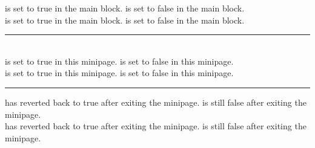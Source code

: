 \ifTestIfa
     is set to true in the main block.
\else
     is set to false in the main block.
\fi\\
\ifTestIfb
     is set to true in the main block.
\else
     is set to false in the main block.
\fi

\begin{minipage}{5in}
    \rule{3in}{0.1em}\\
    \TestIfafalse
    \TestIfbfalse
    \ifTestIfa
         is set to true in this minipage.
    \else
         is set to false in this minipage.
    \fi\\
    \ifTestIfb
         is set to true in this minipage.
    \else
         is set to false in this minipage.
    \fi\\
    \rule{3in}{0.1em}
\end{minipage}

    \ifTestIfa
         has reverted back to true after exiting the minipage.
    \else
         is still false after exiting the minipage.
    \fi\\
    \ifTestIfb
         has reverted back to true after exiting the minipage.
    \else
         is still false after exiting the minipage.
    \fi
